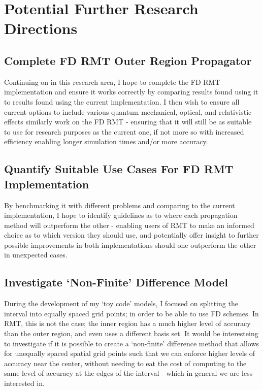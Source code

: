 \section{Potential Further Research Directions}

\subsection{Complete FD RMT Outer Region Propagator}
Continuing on in this research area, I hope to complete the FD RMT implementation and ensure it works correctly by comparing results found using it to results found using the current implementation. I then wish to ensure all current options to include various quantum-mechanical, optical, and relativistic effects similarly work on the FD RMT - ensuring that it will still be as suitable to use for research purposes as the current one, if not more so with increased efficiency enabling longer simulation times and/or more accuracy.

\subsection{Quantify Suitable Use Cases For FD RMT Implementation}
By benchmarking it with different problems and comparing to the current implementation, I hope to identify guidelines as to where each propagation method will outperform the other - enabling users of RMT to make an informed choice as to which version they should use, and potentially offer insight to further possible improvements in both implementations should one outperform the other in unexpected cases.

\subsection{Investigate `Non-Finite' Difference Model}
During the development of my `toy code' models, I focused on splitting the interval into equally spaced grid points; in order to be able to use FD schemes. In RMT, this is not the case; the inner region has a much higher level of accuracy than the outer region, and even uses a different basis set. It would be interesteing to investigate if it is possible to create a `non-finite' difference method that allows for unequally spaced spatial grid points such that we can enforce higher levels of accuracy near the center, without needing to eat the cost of computing to the same level of accuracy at the edges of the interval - which in general we are less interested in. 

